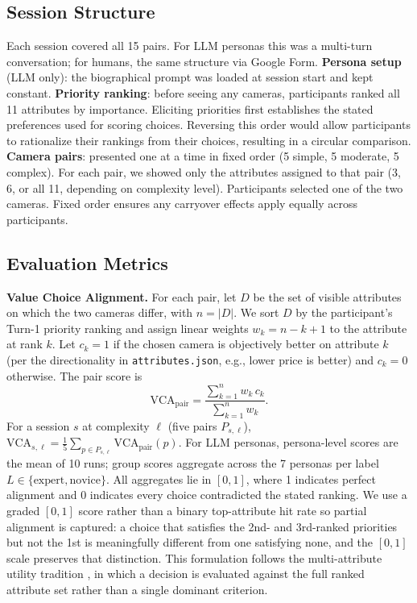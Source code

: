 \documentclass[manuscript,review]{acmart}
\begin{document}
\subsection{Session Structure}
Each session covered all 15 pairs. For LLM personas this was a multi-turn conversation; for humans, the same structure via Google Form. \textbf{Persona setup} (LLM only): the biographical prompt was loaded at session start and kept constant. \textbf{Priority ranking}: before seeing any cameras, participants ranked all 11 attributes by importance. Eliciting priorities first establishes the stated preferences used for scoring choices. Reversing this order would allow participants to rationalize their rankings from their choices, resulting in a circular comparison. \textbf{Camera pairs}: presented one at a time in fixed order (5 simple, 5 moderate, 5 complex). For each pair, we showed only the attributes assigned to that pair (3, 6, or all 11, depending on complexity level). Participants selected one of the two cameras. Fixed order ensures any carryover effects apply equally across participants.

\subsection{Evaluation Metrics}
\textbf{Value Choice Alignment.} For each pair, let $D$ be the set of visible attributes on which the two cameras differ, with $n = |D|$. We sort $D$ by the participant's Turn-1 priority ranking and assign linear weights $w_k = n - k + 1$ to the attribute at rank $k$. Let $c_k = 1$ if the chosen camera is objectively better on attribute $k$ (per the directionality in \texttt{attributes.json}, e.g., lower price is better) and $c_k = 0$ otherwise. The pair score is
\begin{equation}
\mathrm{VCA}_{\text{pair}} = \frac{\sum_{k=1}^{n} w_k \, c_k}{\sum_{k=1}^{n} w_k}.
\end{equation}
For a session $s$ at complexity $\ell$ (five pairs $P_{s,\ell}$), $\mathrm{VCA}_{s,\ell} = \frac{1}{5}\sum_{p \in P_{s,\ell}} \mathrm{VCA}_{\text{pair}}(p)$. For LLM personas, persona-level scores are the mean of 10 runs; group scores aggregate across the 7 personas per label $L \in \{\text{expert}, \text{novice}\}$. All aggregates lie in $[0,1]$, where 1 indicates perfect alignment and 0 indicates every choice contradicted the stated ranking. We use a graded $[0,1]$ score rather than a binary top-attribute hit rate so partial alignment is captured: a choice that satisfies the 2nd- and 3rd-ranked priorities but not the 1st is meaningfully different from one satisfying none, and the $[0,1]$ scale preserves that distinction. This formulation follows the multi-attribute utility tradition \cite{keeney1976decisions}, in which a decision is evaluated against the full ranked attribute set rather than a single dominant criterion.
\end{document}
